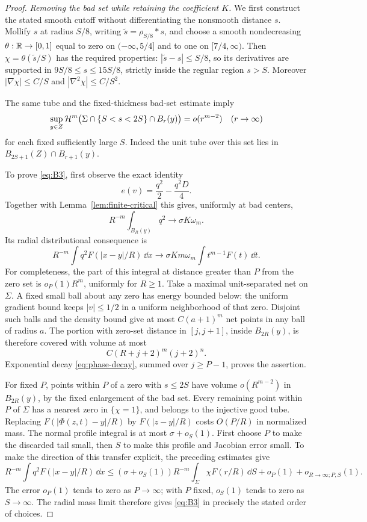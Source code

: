 \begin{proof}
\emph{Removing the bad set while retaining the coefficient $K$.}
We first construct the stated smooth cutoff without differentiating the
nonsmooth distance $s$.  Mollify \(s\) at radius
\(S/8\), writing \(\widetilde s=\rho_{S/8}*s\), and choose a smooth
nondecreasing \(\theta:\mathbb R\to[0,1]\) equal to zero on
\(( -\infty,5/4]\) and to one on \([7/4,\infty)\).
Then \(\chi=\theta(\widetilde s/S)\) has the required properties:
\(|\widetilde s-s|\le S/8\), so its derivatives are supported in
\(9S/8\le s\le15S/8\), strictly inside the regular region \(s>S\).
Moreover \(|\nabla\chi|\le C/S\) and
\(|\nabla^2\chi|\le C/S^2\).

The same tube and the fixed-thickness bad-set estimate imply
\begin{equation}\label{eq:finite-collar-area}
 \sup_{y\in Z}\mathcal H^m\bigl(\Sigma\cap\{S<s<2S\}\cap B_r(y)\bigr)
   =o(r^{m-2})
 \quad(r\to\infty)
\end{equation}
for each fixed sufficiently large \(S\).  Indeed the unit tube over
this set lies in \(B_{2S+1}(Z)\cap B_{r+1}(y)\).

To prove \eqref{eq:B3}, first observe the exact identity
\[
 e(v)=\frac{q^2}{2}-\frac{q^2D}{4}.
\]
Together with Lemma~\ref{lem:finite-critical} this gives, uniformly at
bad centers,
\begin{equation}\label{eq:finite-qmass}
 R^{-m}\int_{B_R(y)}q^2\longrightarrow \sigma K\omega_m.
\end{equation}
Its radial distributional consequence is
\[
 R^{-m}\int q^2F(|x-y|/R)\,\dd x
 \longrightarrow
 \sigma K m\omega_m\int t^{m-1}F(t)\,\dd t.
\]
For completeness, the part of this integral at distance greater than
\(P\) from the zero set is \(o_P(1)R^m\), uniformly for \(R\ge1\).
Take a maximal unit-separated net on \(\Sigma\).  A fixed small ball
about any zero has energy bounded below: the uniform gradient bound
keeps \(|v|\le1/2\) in a uniform neighborhood of that zero.
Disjoint such balls and the density bound give at most
\(C(a+1)^m\) net points in any ball of radius \(a\).
The portion with zero-set distance in \([j,j+1]\), inside \(B_{2R}(y)\),
is therefore covered with volume at most
\[
 C(R+j+2)^m(j+2)^n.
\]
Exponential decay \eqref{eq:phase-decay}, summed over \(j\ge P-1\),
proves the assertion.

For fixed \(P\), points within \(P\) of a zero with \(s\le2S\)
have volume \(o(R^{m-2})\) in \(B_{2R}(y)\), by the fixed enlargement
of the bad set.  Every remaining point within \(P\) of \(\Sigma\)
has a nearest zero in \(\{\chi=1\}\), and belongs to the injective
good tube.  Replacing \(F(|\Phi(z,t)-y|/R)\) by \(F(|z-y|/R)\)
costs \(O(P/R)\) in normalized mass.  The normal profile integral
is at most \(\sigma+o_S(1)\).  First choose \(P\) to make the discarded
tail small, then \(S\) to make this profile and Jacobian error small.
To make the direction of this transfer explicit, the preceding estimates
give
\[
 R^{-m}\int q^2F(|x-y|/R)\,\dd x
 \le (\sigma+o_S(1))R^{-m}\int_\Sigma\chi F(r/R)\,\dd S
       +o_P(1)+o_{R\to\infty;P,S}(1).
\]
The error \(o_P(1)\) tends to zero as \(P\to\infty\); with \(P\)
fixed, \(o_S(1)\) tends to zero as \(S\to\infty\).
The radial mass limit therefore gives \eqref{eq:B3} in precisely the
stated order of choices.


\end{proof}
